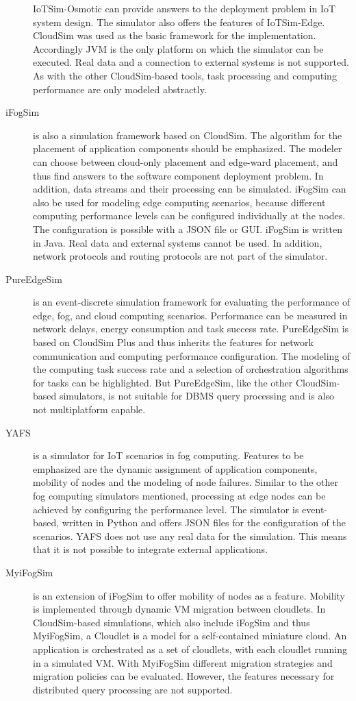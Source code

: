 \documentclass[english,version-2019-11]{uzl-thesis}
\begin{document}
\begin{description}
IoTSim-Osmotic can provide answers to the deployment problem in IoT system design. The simulator also offers the features of IoTSim-Edge. CloudSim was used as the basic framework for the implementation. Accordingly JVM is the only platform on which the simulator can be executed. Real data and a connection to external systems is not supported. As with the other CloudSim-based tools, task processing and computing performance are only modeled abstractly.
\item[iFogSim]\cite{simulator_iFogSim} is also a simulation framework based on CloudSim. The algorithm for the placement of application components should be emphasized. The modeler can choose between cloud-only placement and edge-ward placement, and thus find answers to the software component deployment problem. In addition, data streams and their processing can be simulated. iFogSim can also be used for modeling edge computing scenarios, because different computing performance levels can be configured individually at the nodes. The configuration is possible with a JSON file or GUI. iFogSim is written in Java. Real data and external systems cannot be used. In addition, network protocols and routing protocols are not part of the simulator.
\item[PureEdgeSim]\cite{simulator_PureEdgeSim} is an event-discrete simulation framework for evaluating the performance of edge, fog, and cloud computing scenarios. Performance can be measured in network delays, energy consumption and task success rate. PureEdgeSim is based on CloudSim Plus and thus inherits the features for network communication and computing performance configuration. The modeling of the computing task success rate and a selection of orchestration algorithms for tasks can be highlighted. But PureEdgeSim, like the other CloudSim-based simulators, is not suitable for DBMS query processing and is also not multiplatform capable.
\item[YAFS]\cite{simulator_YAFS} is a simulator for IoT scenarios in fog computing. Features to be emphasized are the dynamic assignment of application components, mobility of nodes and the modeling of node failures. Similar to the other fog computing simulators mentioned, processing at edge nodes can be achieved by configuring the performance level. The simulator is event-based, written in Python and offers JSON files for the configuration of the scenarios. YAFS does not use any real data for the simulation. This means that it is not possible to integrate external applications.
\item[MyiFogSim]\cite{simulator_MyiFogSim} is an extension of iFogSim to offer mobility of nodes as a feature. Mobility is implemented through dynamic VM migration between cloudlets. In CloudSim-based simulations, which also include iFogSim and thus MyiFogSim, a Cloudlet is a model for a self-contained miniature cloud. An application is orchestrated as a set of cloudlets, with each cloudlet running in a simulated VM. With MyiFogSim different migration strategies and migration policies can be evaluated. However, the features necessary for distributed query processing are not supported.

\end{description}
\end{document}
